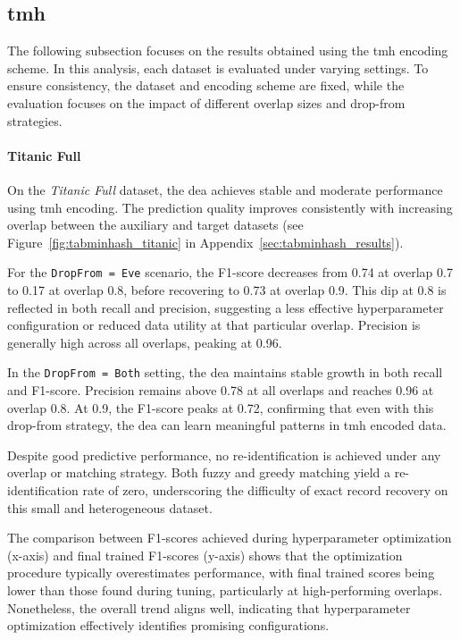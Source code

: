 \subsection{\ac{tmh}}

The following subsection focuses on the results obtained using the \ac{tmh} encoding scheme.
In this analysis, each dataset is evaluated under varying settings.
To ensure consistency, the dataset and encoding scheme are fixed, while the evaluation focuses on the impact of different overlap sizes and drop-from strategies.

\paragraph{Titanic Full}

On the \textit{Titanic Full} dataset, the \ac{dea} achieves stable and moderate performance using \ac{tmh} encoding.
The prediction quality improves consistently with increasing overlap between the auxiliary and target datasets (see Figure~\ref{fig:tabminhash_titanic} in Appendix~\ref{sec:tabminhash_results}).

For the \texttt{DropFrom = Eve} scenario, the F1-score decreases from 0.74 at overlap 0.7 to 0.17 at overlap 0.8, before recovering to 0.73 at overlap 0.9.
This dip at 0.8 is reflected in both recall and precision, suggesting a less effective hyperparameter configuration or reduced data utility at that particular overlap.
Precision is generally high across all overlaps, peaking at 0.96.

In the \texttt{DropFrom = Both} setting, the \ac{dea} maintains stable growth in both recall and F1-score.
Precision remains above 0.78 at all overlaps and reaches 0.96 at overlap 0.8.
At 0.9, the F1-score peaks at 0.72, confirming that even with this drop-from strategy, the \ac{dea} can learn meaningful patterns in \ac{tmh} encoded data.

Despite good predictive performance, no re-identification is achieved under any overlap or matching strategy.
Both fuzzy and greedy matching yield a re-identification rate of zero, underscoring the difficulty of exact record recovery on this small and heterogeneous dataset.

The comparison between F1-scores achieved during hyperparameter optimization (x-axis) and final trained F1-scores (y-axis) shows that the optimization procedure typically overestimates performance, with final trained scores being lower than those found during tuning, particularly at high-performing overlaps.
Nonetheless, the overall trend aligns well, indicating that hyperparameter optimization effectively identifies promising configurations.

